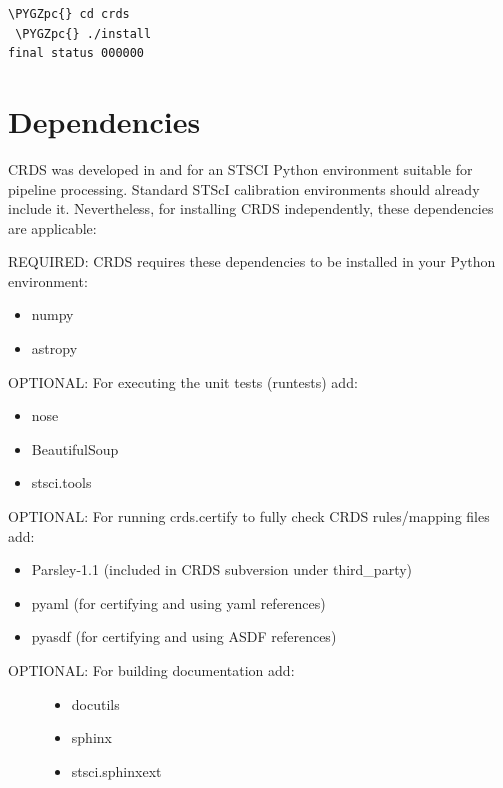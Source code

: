 \documentclass[letterpaper,10pt,english]{sphinxmanual}
\def\PYGZpc{\char`\%}
\begin{document}
\begin{Verbatim}[commandchars=\\\{\}]
 \PYGZpc{} cd crds
 \PYGZpc{} ./install
final status 000000
\end{Verbatim}


\section{Dependencies}
\label{installation:dependencies}
CRDS was developed in and for an STSCI Python environment suitable for pipeline
processing.   Standard STScI calibration environments should already include it.
Nevertheless, for installing CRDS independently, these dependencies are applicable:

REQUIRED: CRDS requires these dependencies to be installed in your Python environment:
\begin{itemize}
\item {} 
numpy

\item {} 
astropy

\end{itemize}

OPTIONAL: For executing the unit tests (runtests) add:
\begin{itemize}
\item {} 
nose

\item {} 
BeautifulSoup

\item {} 
stsci.tools

\end{itemize}

OPTIONAL: For running crds.certify to fully check CRDS rules/mapping files add:
\begin{itemize}
\item {} 
Parsley-1.1  (included in CRDS subversion under third\_party)

\item {} 
pyaml  (for certifying and using yaml references)

\item {} 
pyasdf (for certifying and using ASDF references)

\end{itemize}
\begin{description}
\item[{OPTIONAL: For building documentation add:}] \leavevmode\begin{itemize}
\item {} 
docutils

\item {} 
sphinx

\item {} 
stsci.sphinxext

\end{itemize}

\end{description}
\end{document}
